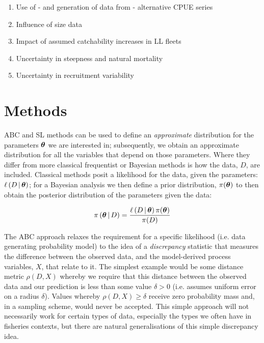 \documentclass[12pt,a4paper,twoside,times,sky,standard]{csiroreport2017}
\newcommand{\xtheta}{\mbox{\boldmath$\theta$}}
\begin{document}
\begin{enumerate}
    \item Use of - and generation of data from - alternative CPUE series
    \item Influence of size data
    \item Impact of assumed catchability increases in LL fleets
    \item Uncertainty in steepness and natural mortality
    \item Uncertainty in recruitment variability
\end{enumerate}

\section{Methods}

ABC \cite{abc} and SL \cite{synlkhd} methods can be used to define an \emph{approximate} distribution for the parameters $\xtheta$ we are interested in; subsequently, we obtain an approximate distribution for all the variables that depend on those parameters. Where they differ from more classical frequentist or Bayesian methods is how the data, $D$, are included. Classical methods posit a likelihood for the data, given the parameters: $\ell\left(D\,|\,\xtheta\right)$; for a Bayesian analysis we then define a prior distribution, $\pi(\xtheta)$ to then obtain the posterior distribution of the parameters given the data:

\begin{equation*}
  \pi\left(\xtheta\,|\,D\right) = \frac{\ell\left(D\,|\,\xtheta\right)\pi(\xtheta)}{\pi(D)}
\end{equation*}

The ABC approach relaxes the requirement for a specific likelihood (i.e. data generating probability model) to the idea of a \emph{discrepancy} statistic that measures the difference between the observed data, and the model-derived process variables, $X$, that relate to it. The simplest example would be some distance metric $\rho(D,X)$ whereby we require that this distance between the observed data and our prediction is less than some value $\delta>0$ (i.e. assumes uniform error on a radius $\delta$). Values whereby $\rho(D,X)\geq\delta$ receive zero probability mass and, in a sampling scheme, would never be accepted. This simple approach will not necessarily work for certain types of data, especially the types we often have in fisheries contexts, but there are natural generalisations of this simple discrepancy idea.
\end{document}
